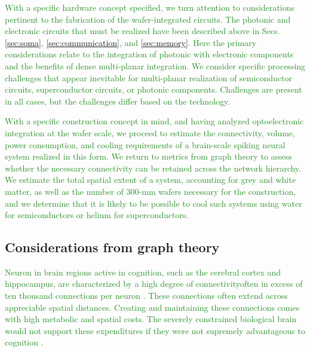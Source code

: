 \documentclass[twocolumn]{article}
\begin{document}
\textcolor{ForestGreen}{With a specific hardware concept specified, we turn attention to considerations pertinent to the fabrication of the wafer-integrated circuits. The photonic and electronic circuits that must be realized have been described above in Secs. \ref{sec:soma}, \ref{sec:communication}, and \ref{sec:memory}. Here the primary considerations relate to the integration of photonic with electronic components and the benefits of dense multi-planar integration. We consider specific processing challenges that appear inevitable for multi-planar realization of semiconductor circuits, superconductor circuits, or photonic components. Challenges are present in all cases, but the challenges differ based on the technology.}

\textcolor{ForestGreen}{With a specific construction concept in mind, and having analyzed optoelectronic integration at the wafer scale, we proceed to estimate the connectivity, volume, power consumption, and cooling requirements of a brain-scale spiking neural system realized in this form. We return to metrics from graph theory to assess whether the necessary connectivity can be retained across the network hierarchy. We estimate the total spatial extent of a system, accounting for grey and white matter, as well as the number of 300-mm wafers necessary for the construction, and we determine that it is likely to be possible to cool such systems using water for semiconductors or helium for superconductors.}

\subsection{Considerations from graph theory}
\textcolor{ForestGreen}{Neuron in brain regions active in cognition, such as the cerebral cortex and hippocampus, are characterized by a high degree of connectivity\textemdash often in excess of ten thousand connections per neuron \cite{brsc1998,bu2006}. These connections often extend across appreciable spatial distances. Creating and maintaining these connections comes with high metabolic and spatial costs. The severely constrained biological brain would not support these expenditures if they were not supremely advantageous to cognition \cite{busp2012}.}
\end{document}
